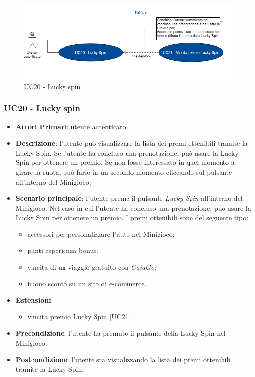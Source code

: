 \begin{figure}[h]
	\includegraphics[width=13cm]{res/images/UC20Luckyspin.png}
	\centering
	\caption{UC20 - Lucky spin}
\end{figure}
\subsubsection{UC20 - Lucky spin}
\begin{itemize}
	\item \textbf{Attori Primari}: utente autenticato;
	\item \textbf{Descrizione}:	l'utente può visualizzare la lista dei premi ottenibili tramite la Lucky Spin\glo. Se l'utente ha concluso una prenotazione, può usare la Lucky Spin per ottenere un premio. Se non fosse interessato in quel momento a girare la ruota, può farlo in un secondo momento cliccando sul pulsante all'interno del Minigioco;
	\item \textbf{Scenario principale}: l'utente preme il pulsante \textit{Lucky Spin} all'interno del Minigioco. Nel caso in cui l'utente ha concluso una prenotazione, può usare la Lucky Spin per ottenere un premio. I premi ottenibili sono del seguente tipo:
	\begin{itemize}
		\item accessori per personalizzare l'auto nel Minigioco;
		\item punti esperienza bonus;
		\item vincita di un viaggio gratuito con \textit{GaiaGo};
		\item buono sconto su un sito di e-commerce.	
	\end{itemize}
	\item \textbf{Estensioni}: 
	\begin{itemize}
		\item vincita premio Lucky Spin [UC21].
	\end{itemize}
	\item \textbf{Precondizione}: l'utente ha premuto il pulsante della Lucky Spin nel Minigioco;
	\item \textbf{Postcondizione}: l'utente sta visualizzando la lista dei premi ottenibili tramite la Lucky Spin.
\end{itemize}

